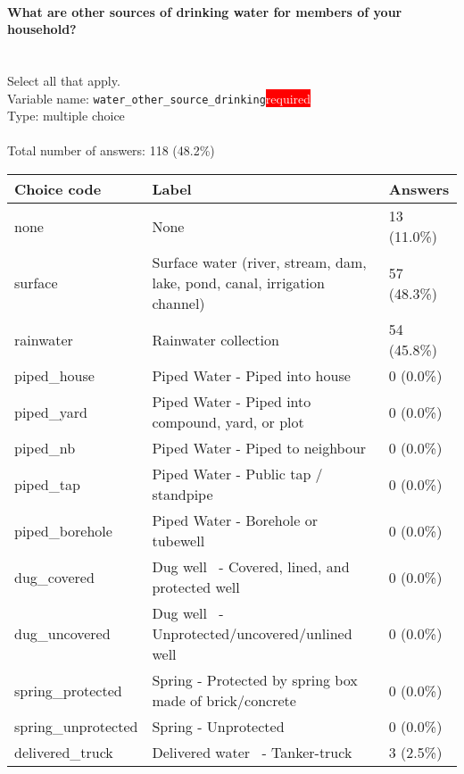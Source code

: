 \documentclass[11.5pt, a4paper]{scrartcl}
\begin{document}
\paragraph{What are other sources of drinking water for members of your household?}
\ \\ {\small Select all that apply. }
\  \\Variable name: \texttt{water\_other\_source\_drinking}\hfill\colorbox{red}{\small{\textcolor{white}{required}}}\\
 Type: multiple choice\\
\\Total number of answers: 118 (48.2\%)
\\[0.2em] \begin{tabular}{p{4cm}|p{8cm}|p{3cm}}
Choice code & Label & Answers \\
\hline
none & None& \cellcolor{color0}13 (11.0\%)\\
\cellcolor{mygray} surface & \cellcolor{mygray}Surface water (river, stream, dam, lake, pond, canal, irrigation channel) & \cellcolor{color2}57 (48.3\%)\\
rainwater & Rainwater collection & \cellcolor{color2}54 (45.8\%)\\
\cellcolor{mygray} piped\_house & \cellcolor{mygray}Piped Water - Piped into house & \cellcolor{color0}0 (0.0\%)\\
piped\_yard & Piped Water - Piped into compound, yard, or plot& \cellcolor{color0}0 (0.0\%)\\
\cellcolor{mygray} piped\_nb & \cellcolor{mygray}Piped Water - Piped to neighbour  & \cellcolor{color0}0 (0.0\%)\\
piped\_tap & Piped Water - Public tap / standpipe & \cellcolor{color0}0 (0.0\%)\\
\cellcolor{mygray} piped\_borehole & \cellcolor{mygray}Piped Water - Borehole or tubewell  & \cellcolor{color0}0 (0.0\%)\\
dug\_covered & Dug well  - Covered, lined, and protected well & \cellcolor{color0}0 (0.0\%)\\
\cellcolor{mygray} dug\_uncovered & \cellcolor{mygray}Dug well  - Unprotected/uncovered/unlined well  & \cellcolor{color0}0 (0.0\%)\\
spring\_protected & Spring - Protected by spring box made of brick/concrete& \cellcolor{color0}0 (0.0\%)\\
\cellcolor{mygray} spring\_unprotected & \cellcolor{mygray}Spring - Unprotected  & \cellcolor{color0}0 (0.0\%)\\
delivered\_truck & Delivered water  - Tanker-truck & \cellcolor{color0}3 (2.5\%)\\

\end{tabular}
\end{document}
